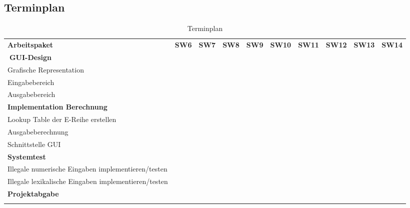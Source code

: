 \begin{landscape}
	\section{Terminplan}
	\centering
	\begin{table}[h!]
		\begin{tabu}{|l|c|c|c|c|c|c|c|c|c|}
			\tabucline[1pt]{-}
			 \textbf{Arbeitspaket} & \textbf{SW6} & \textbf{SW7} & \textbf{SW8} & \textbf{SW9} & \textbf{SW10} & \textbf{SW11} & \textbf{SW12} & \textbf{SW13} & \textbf{SW14} \\
			 \tabucline[0.5pt]{-}  \hline \hline
			 \textbf{GUI-Design}&&&&&&&&&\\\hline
			 Grafische Representation &&&  &&&  &  &  &  \\\hline
			 Eingabebereich &&&  &&&  &  &  & \\\hline
			 Ausgabebereich &&&  &&&  &  &  & \\
			 \hline \hline
			 \textbf{Implementation Berechnung} &&&&&&&&& \\\hline
			 Lookup Table der E-Reihe erstellen &&&&  && &  &  & \\\hline
			 Ausgabeberechnung &&&& && &  &  & \\\hline
			 Schnittstelle GUI &&&& && &  &  & \\
			 \hline \hline
			 \textbf{Systemtest} &&&&&&&&& \\\hline
			 Illegale numerische Eingaben implementieren/testen &&&&&  &  &  &  & \\\hline
			 Illegale lexikalische Eingaben implementieren/testen &&&&&  &  &  &  & \\
			 \hline \hline
			 \textbf{Projektabgabe} &&&&&&&&&  \\			 
			 \tabucline[1pt]{-}
		\end{tabu}
	\caption{Terminplan}
	\label{table:1}
	\end{table}
	

\end{landscape}
